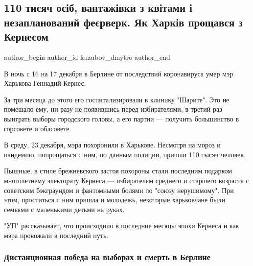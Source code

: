  
 
 
 
 
 
\subsection{110 тисяч осіб, вантажівки з квітами і незапланований феєрверк. Як Харків прощався з Кернесом}
\label{sec:24_12_2020.news.ua.pravda.kuzubov_dmytro.1.kernes_proschannja}
\ifcmt
  author_begin
   author_id kuzubov_dmytro
  author_end
\fi


В ночь с 16 на 17 декабря в Берлине от последствий коронавируса умер мэр
Харькова Геннадий Кернес.

За три месяца до этого его госпитализировали в клинику "Шарите". Это не
помешало ему, ни разу не появившись перед избирателями, в третий раз выиграть
выборы городского головы, а его партии — получить большинство в горсовете и
облсовете.

В среду, 23 декабря, мэра похоронили в Харькове. Несмотря на мороз и пандемию,
попрощаться с ним, по данным полиции, пришли 110 тысяч человек.

Пышные, в стиле брежневского застоя похороны стали последним подарком
многолетнему электорату Кернеса — избирателям среднего и старшего возраста с
советским бэкграундом и фантомными болями по "союзу нерушимому". При этом,
проститься с ним пришла и молодежь, некоторые харьковчане были семьями с
маленькими детьми на руках.

"УП" рассказывает, что происходило в последние месяцы эпохи Кернеса и как мэра
провожали в последний путь.

\subsubsection{Дистанционная победа на выборах и смерть в Берлине}

